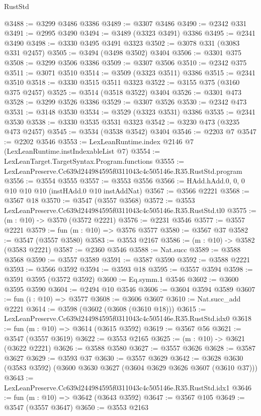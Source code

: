 \begin{lexlean}{RustStd}
\begin{coremodule}
@3488 := @3299 @3486 @3386
@3489 := @3307 @3486
@3490 := @2342 @331
@3491 := @2995 @3490
@3494 := @3489 (@3323 @3491) @3386
@3495 := @2341 @3490
@3498 := @3330 @3495 @3491 @3323
@3502 := @3078 @331 (@3083 @331 @2457)
@3505 := @3494 (@3498 @3502) @3404
@3506 := @3301 @375
@3508 := @3299 @3506 @3386
@3509 := @3307 @3506
@3510 := @2342 @375
@3511 := @3071 @3510
@3514 := @3509 (@3323 @3511) @3386
@3515 := @2341 @3510
@3518 := @3330 @3515 @3511 @3323
@3522 := @3155 @375 (@3160 @375 @2457)
@3525 := @3514 (@3518 @3522) @3404
@3526 := @3301 @473
@3528 := @3299 @3526 @3386
@3529 := @3307 @3526
@3530 := @2342 @473
@3531 := @3148 @3530
@3534 := @3529 (@3323 @3531) @3386
@3535 := @2341 @3530
@3538 := @3330 @3535 @3531 @3323
@3542 := @3230 @473 (@3235 @473 @2457)
@3545 := @3534 (@3538 @3542) @3404
@3546 := @2203 @7
@3547 := @2202 @3546
@3553 := LexLeanRuntime.index @2146 @7 (LexLeanRuntime.instIndexableList @7)
@3554 := LexLeanTarget.TargetSyntax.Program.functions
@3555 := LexLeanPreserve.Cc639d244984595f0311043c4c505146e.R35.RustStd.program
@3556 := @3554 @3555
@3557 := @3553 @3556
@3566 := HAdd.hAdd.{0, 0, 0} @10 @10 @10 (instHAdd.{0} @10 instAddNat)
@3567 := @3566 @2221
@3568 := @3567 @18
@3570 := @3547 (@3557 @3568)
@3572 := @3553 LexLeanPreserve.Cc639d244984595f0311043c4c505146e.R35.RustStd.tl0
@3575 := (m : @10) -> @3570 (@3572 @2221)
@3576 := @2231 @3546
@3577 := @3557 @2221
@3579 := fun (m : @10) => @3576 @3577
@3580 := @3567 @37
@3582 := @3547 (@3557 @3580)
@3583 := @3553 @2167
@3586 := (m : @10) -> @3582 (@3583 @2221)
@3587 := @2360 @3546
@3588 := Nat.succ
@3589 := @3588 @3568
@3590 := @3557 @3589
@3591 := @3587 @3590
@3592 := @3588 @2221
@3593 := @3566 @3592
@3594 := @3593 @18
@3595 := @3557 @3594
@3598 := @3591 @3595 (@3572 @3592)
@3600 := Eq.symm.{1} @3546
@3602 := @3600 @3595 @3590
@3604 := @2494 @10 @3546
@3606 := @3604 @3594 @3589
@3607 := fun (i : @10) => @3577
@3608 := @3606 @3607
@3610 := Nat.succ_add @2221
@3614 := @3598 (@3602 (@3608 (@3610 @18)))
@3615 := LexLeanPreserve.Cc639d244984595f0311043c4c505146e.R35.RustStd.idx0
@3618 := fun (m : @10) => @3614 (@3615 @3592)
@3619 := @3567 @56
@3621 := @3547 (@3557 @3619)
@3622 := @3553 @2165
@3625 := (m : @10) -> @3621 (@3622 @2221)
@3626 := @3588 @3580
@3627 := @3557 @3626
@3628 := @3587 @3627
@3629 := @3593 @37
@3630 := @3557 @3629
@3642 := @3628 @3630 (@3583 @3592) (@3600 @3630 @3627 (@3604 @3629 @3626 @3607 (@3610 @37)))
@3643 := LexLeanPreserve.Cc639d244984595f0311043c4c505146e.R35.RustStd.idx1
@3646 := fun (m : @10) => @3642 (@3643 @3592)
@3647 := @3567 @105
@3649 := @3547 (@3557 @3647)
@3650 := @3553 @2163

\end{coremodule}
\end{lexlean}
